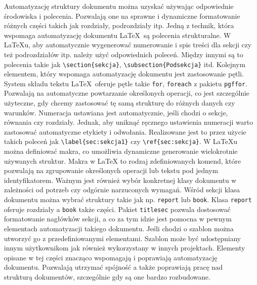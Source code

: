 
Automatyzację struktury dokumentu można uzyskać używając odpowiednie środowiska i polecenia. Pozwalają one na sprawne i dynamiczne formatowanie różnych części takich jak rozdziały, podrozdziały itp.  Jedną z technik, która wspomaga automatyzację dokumentu \LaTeX\ są polecenia strukturalne. W \LaTeX{u}, aby automatycznie wygenerować numerowanie i spis treści dla sekcji czy też podrozdziałów itp. należy użyć odpowiednich poleceń. Między innymi są to polecenia takie jak \texttt{\textbackslash section{\{sekcja\}}}, \texttt{\textbackslash subsection{\{Podsekcja}\}} itd. Kolejnym elementem, który wspomaga automatyzację dokumentu jest zastosowanie pętli. System składu tekstu \LaTeX\ oferuje pętle takie \texttt{for}, \texttt{foreach} z pakietu \texttt{pgffor}. Pozwalają na automatyczne powtarzanie określonych operacji, co jest szczególnie użyteczne, gdy chcemy zastosować tę samą strukturę do różnych danych czy warunków. Numeracja ustawiana jest automatycznie, jeśli chodzi o sekcje, równania czy rozdziały. Jednak, aby uniknąć ręcznego ustawienia numeracji warto zastosować automatyczne etykiety i odwołania. Realizowane jest to przez użycie takich poleceń jak \texttt{\textbackslash label{\{sec:sekcja1}\}} czy \texttt{\textbackslash ref{\{sec:sekcja}\}}. W \LaTeX{u} można definiować makra, co umożliwia dynamiczne generowanie wielokrotnie używanych struktur. Makra w LaTeX to rodzaj zdefiniowanych komend, które pozwalają na zgrupowanie określonych operacji lub tekstu pod jednym identyfikatorem.  Ważnym jest również wybór konkretnej klasy dokumentu w zależności od potrzeb czy odgórnie narzuconych wymagań. Wśród sekcji klasa dokumentu można wybrać struktury takie jak np. \texttt{report} lub \texttt{book}. Klasa \texttt{report} oferuje rozdziały a \texttt{book} także części. Pakiet \texttt{titlesec} pozwala dostosować formatowanie nagłówków sekcji, a co za tym idzie jest pomocna w pewnym elementach automatyzacji takiego dokumentu. Jeśli chodzi o szablon można utworzyć go z przedefiniowanymi elementami. Szablon może być udostępniany innym użytkownikom jak również wykorzystany w innych projektach. Elementy opisane w tej części znacząco wspomagają i poprawiają automatyzację dokumentu. Pozwalają utrzymać spójność a także poprawiają pracę nad strukturą dokumentów, szczególnie gdy są one bardzo rozbudowane. 

